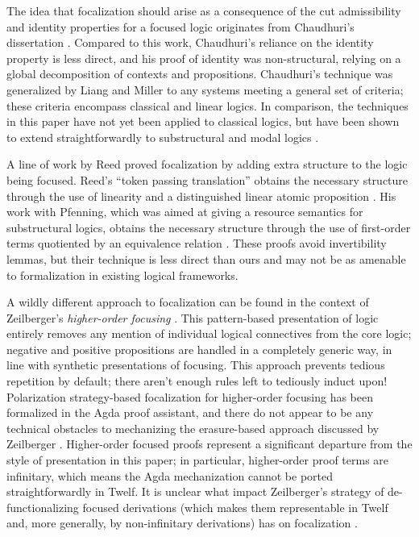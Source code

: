 \documentclass[acmtocl]{robtrans}\pdfoutput=1
\begin{document}
The idea that focalization should arise as a consequence of the 
cut admissibility
and identity properties for a focused logic
originates from Chaudhuri's dissertation
\cite{chaudhuri06focused}. Compared to this work, Chaudhuri's reliance on 
the identity property is less direct, and his proof of identity was 
non-structural, relying on a global decomposition of contexts and
propositions. Chaudhuri's technique was generalized by 
Liang and Miller  to any systems meeting 
a general set of criteria; 
these criteria encompass classical and linear logics. In comparison,
the techniques in this paper have not
yet been applied to classical logics,
but have been shown to extend straightforwardly to substructural 
and modal logics \cite{simmons12substructural}.

A line of work by Reed proved focalization by adding extra structure
to the logic being focused. Reed's ``token passing translation''
obtains the necessary structure through the use of linearity and a
distinguished linear atomic proposition \cite{reed08focalizing}. His
work with Pfenning, which was aimed at giving a resource semantics for
substructural logics, obtains the necessary structure through the use
of first-order terms quotiented by an equivalence relation
\cite{reed10focus}. These proofs avoid invertibility lemmas, but their
technique is less direct than ours and may not be as amenable to
formalization in existing logical frameworks.

A wildly different approach to focalization can be found in the
context of Zeilberger's {\it higher-order focusing}
\cite{zeilberger08focusing}. This pattern-based presentation of logic
entirely removes any mention of individual logical connectives from
the core logic; negative and positive propositions are handled in a
completely generic way, in line with synthetic presentations of
focusing. This approach prevents tedious repetition by
default; there aren't enough rules left to tediously induct upon!
Polarization strategy-based focalization for higher-order focusing has
been formalized in the Agda proof assistant, and there do not appear
to be any technical obstacles to mechanizing the erasure-based
approach discussed by Zeilberger .
Higher-order focused proofs represent a significant departure from the
style of presentation in this paper; in particular, higher-order proof
terms are infinitary, which means the Agda mechanization cannot be
ported straightforwardly in Twelf. It is unclear what impact
Zeilberger's strategy of de-functionalizing focused derivations (which
makes them representable in Twelf and, more generally, by
non-infinitary derivations) has on focalization
\cite{zeilberger09defunctionalizing}.
\end{document}

